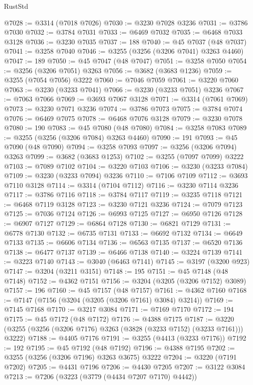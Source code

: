 \begin{lexlean}{RustStd}
\begin{coremodule}
@7028 := @3314 (@7018 @7026)
@7030 := @3230 @7028 @3236
@7031 := @3786 @7030
@7032 := @3784 @7031
@7033 := @6469 @7032
@7035 := @6468 @7033 @3128
@7036 := @3230 @7035
@7037 := 188
@7040 := @45 @7037 (@48 @7037)
@7041 := @3258 @7040
@7046 := @3255 (@3256 (@3206 @7041) @3263 @4460)
@7047 := 189
@7050 := @45 @7047 (@48 @7047)
@7051 := @3258 @7050
@7054 := @3256 (@3206 @7051) @3263
@7056 := @3682 (@3683 @1236)
@7059 := @3255 (@7054 @7056) @3222
@7060 := @7046 @7059
@7061 := @3220 @7060
@7063 := @3230 (@3233 @7041)
@7066 := @3230 (@3233 @7051) @3236
@7067 := @7063 @7066
@7069 := @3693 @7067 @3128
@7071 := @3314 (@7061 @7069)
@7073 := @3230 @7071 @3236
@7074 := @3786 @7073
@7075 := @3784 @7074
@7076 := @6469 @7075
@7078 := @6468 @7076 @3128
@7079 := @3230 @7078
@7080 := 190
@7083 := @45 @7080 (@48 @7080)
@7084 := @3258 @7083
@7089 := @3255 (@3256 (@3206 @7084) @3263 @4460)
@7090 := 191
@7093 := @45 @7090 (@48 @7090)
@7094 := @3258 @7093
@7097 := @3256 (@3206 @7094) @3263
@7099 := @3682 (@3683 @1253)
@7102 := @3255 (@7097 @7099) @3222
@7103 := @7089 @7102
@7104 := @3220 @7103
@7106 := @3230 (@3233 @7084)
@7109 := @3230 (@3233 @7094) @3236
@7110 := @7106 @7109
@7112 := @3693 @7110 @3128
@7114 := @3314 (@7104 @7112)
@7116 := @3230 @7114 @3236
@7117 := @3786 @7116
@7118 := @3784 @7117
@7119 := @3235 @7118
@7121 := @6468 @7119 @3128
@7123 := @3230 @7121 @3236
@7124 := @7079 @7123
@7125 := @7036 @7124
@7126 := @6993 @7125
@7127 := @6950 @7126
@7128 := @6907 @7127
@7129 := @6864 @7128
@7130 := @6821 @7129
@7131 := @6778 @7130
@7132 := @6735 @7131
@7133 := @6692 @7132
@7134 := @6649 @7133
@7135 := @6606 @7134
@7136 := @6563 @7135
@7137 := @6520 @7136
@7138 := @6477 @7137
@7139 := @6466 @7138
@7140 := @3224 @7139
@7141 := @3223 @7140
@7143 := @3040 (@6463 @7141)
@7145 := @3197 (@3200 @923)
@7147 := @3204 (@3211 @3151)
@7148 := 195
@7151 := @45 @7148 (@48 @7148)
@7152 := @4362 @7151
@7156 := @3204 (@3205 (@3206 @7152) @3089)
@7157 := 196
@7160 := @45 @7157 (@48 @7157)
@7161 := @4362 @7160
@7168 := @7147 (@7156 (@3204 (@3205 (@3206 @7161) @3084) @3214))
@7169 := @7145 @7168
@7170 := @3217 @3084
@7171 := @7169 @7170
@7172 := 194
@7175 := @45 @7172 (@48 @7172)
@7176 := @4388 @7175
@7187 := @3220 (@3255 (@3256 (@3206 @7176) @3263 (@3828 (@3233 @7152) (@3233 @7161))) @3222)
@7188 := @4405 @7176
@7191 := @3255 (@4413 (@3233 @7176))
@7192 := 192
@7195 := @45 @7192 (@48 @7192)
@7196 := @4388 @7195
@7202 := @3255 (@3256 (@3206 @7196) @3263 @3675) @3222
@7204 := @3220 (@7191 @7202)
@7205 := @4431 @7196
@7206 := @4430 @7205
@7207 := @3122 @3084
@7213 := @7206 (@3223 (@3779 (@4434 @7207 @7170) @4442))

\end{coremodule}
\end{lexlean}
